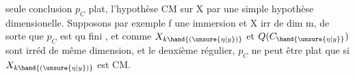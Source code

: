 seule conclusion $p_C$ plat, l'hypothèse CM sur X par une simple hypothèse
dimensionelle. Supposons par exemple f une immersion et X irr de dim m,
de sorte que $p_C$ est qu fini , et comme $X_{k\hand{(\unsure{\eta|y})}}$ et $Q(C_{\hand{\unsure{\eta|y}}})$ sont irréd de
même dimension,  et le deuxième régulier, $p_C$ ne peut être
plat que si $X_{k\hand{(\unsure{\eta|y})}}$ est CM.

